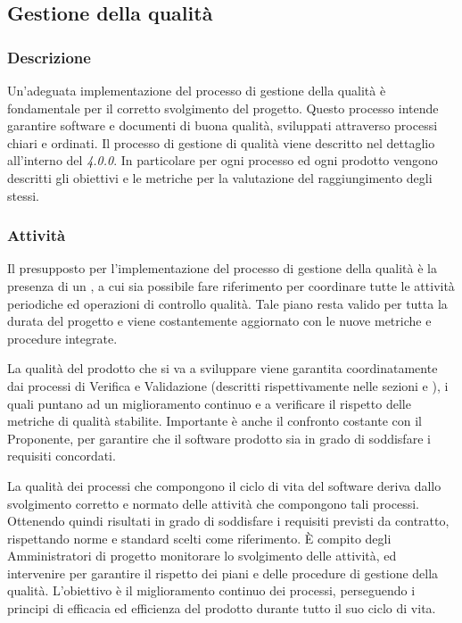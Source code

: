 \subsection{Gestione della qualità}
    \subsubsection{Descrizione}
      Un'adeguata implementazione del processo di gestione della qualità è fondamentale per il corretto svolgimento del progetto. Questo processo intende garantire software e documenti di buona qualità, sviluppati attraverso processi chiari e ordinati. Il processo di gestione di qualità viene descritto nel dettaglio all'interno del \textit{\PdQ{} 4.0.0}. In particolare per ogni processo ed ogni prodotto vengono descritti gli obiettivi e le metriche per la valutazione del raggiungimento degli stessi.
      
    \subsubsection{Attività}
       Il presupposto per l'implementazione del processo di gestione della qualità è la presenza di un \PdQ{}, a cui sia possibile fare riferimento per coordinare tutte le attività periodiche ed operazioni di controllo qualità. Tale piano resta valido per tutta la durata del progetto e viene costantemente aggiornato con le nuove metriche e procedure integrate.

      La qualità del prodotto che si va a sviluppare viene garantita coordinatamente dai processi di Verifica e Validazione (descritti rispettivamente nelle sezioni  e ), i quali puntano ad un miglioramento continuo e a verificare il rispetto delle metriche di qualità stabilite. Importante è anche il confronto costante con il Proponente, per garantire che il software prodotto sia in grado di soddisfare i requisiti concordati.

      La qualità dei processi che compongono il ciclo di vita del software deriva dallo svolgimento corretto e normato delle attività che compongono tali processi. Ottenendo quindi risultati in grado di soddisfare i requisiti previsti da contratto, rispettando norme e standard scelti come riferimento. È compito degli Amministratori di progetto monitorare lo svolgimento delle attività, ed intervenire per garantire il rispetto dei piani e delle procedure di gestione della qualità.
      L'obiettivo è il miglioramento continuo dei processi, perseguendo i principi di efficacia ed efficienza del prodotto durante tutto il suo ciclo di vita.   
	
